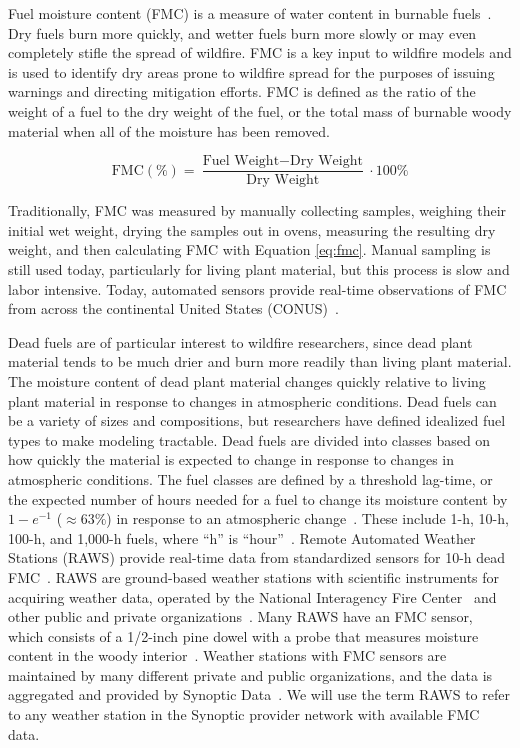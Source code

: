 \documentclass[fire,article,submit,pdftex,moreauthors]{Definitions/mdpi}
\begin{document}
Fuel moisture content (FMC) is a measure of water content in burnable fuels~\citep[e.g.,][]{NCEI-2024-DFM}. Dry fuels burn more quickly, and wetter fuels burn more slowly or may even completely stifle the spread of wildfire. FMC is a key input to wildfire models and is used to identify dry areas prone to wildfire spread for the purposes of issuing warnings and directing mitigation efforts. FMC is defined as the ratio of the weight of a fuel to the dry weight of the fuel, or the total mass of burnable woody material when all of the moisture has been removed. 
\begin{linenomath}
\begin{equation}
\label{eq:fmc}
    \text{FMC} (\%) = \frac{\text{Fuel Weight} - \text{Dry Weight}}{\text{Dry Weight}} \cdot 100\%
\end{equation}
\end{linenomath}
Traditionally, FMC was measured by manually collecting samples, weighing their initial wet weight, drying the samples out in ovens, measuring the resulting dry weight, and then calculating FMC with Equation \ref{eq:fmc}. Manual sampling is still used today, particularly for living plant material, but this process is slow and labor intensive. Today, automated sensors provide real-time observations of FMC from across the continental United States (CONUS)~\citep{NIFC-2024-RAW}. 

Dead fuels are of particular interest to wildfire researchers, since dead plant material tends to be much drier and burn more readily than living plant material. The moisture content of dead plant material changes quickly relative to living plant material in response to changes in atmospheric conditions. Dead fuels can be a variety of sizes and compositions, but researchers have defined idealized fuel types to make modeling tractable. Dead fuels are divided into classes based on how quickly the material is expected to change in response to changes in atmospheric conditions. The fuel classes are defined by a threshold lag-time, or the expected number of hours needed for a fuel to change its moisture content by $1-e^{-1}$ ($\approx63\%$) in response to an atmospheric change~\citep[e.g., p.\ 216][]{Viney-1991-RFF}. These include 1-h, 10-h, 100-h, and 1,000-h fuels, where ``h'' is ``hour''~\citep{NCEI-2024-DFM}. Remote Automated Weather Stations (RAWS) provide real-time data from standardized sensors for 10-h dead FMC~\citep{NIFC-2024-RAW}. RAWS are ground-based weather stations with scientific instruments for acquiring weather data, operated by the National Interagency Fire Center~\citep{NIFC-2024-RAW} and other public and private organizations~\citep{Synoptic-2025-MSN}. Many RAWS have an FMC sensor, which consists of a \mbox{1/2-inch} pine dowel with a probe that measures moisture content in the woody interior~\citep{Campbell-2015-CFM, FTS-2016-FSS}. Weather stations with FMC sensors are maintained by many different private and public organizations, and the data is aggregated and provided by Synoptic Data~\citep{Synoptic-2025-MSN}. We will use the term RAWS to refer to any weather station in the Synoptic provider network with available FMC data. 
\end{document}

